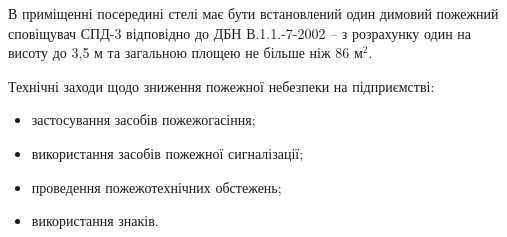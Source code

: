 В приміщенні посередині стелі має бути встановлений один димовий пожежний сповіщувач СПД-3 відповідно до ДБН В.1.1.-7-2002 – з розрахунку один на висоту до 3,5 м та загальною площею не більше ніж 86 м$^2$.

Технічні заходи щодо зниження пожежної небезпеки на підприємстві:
\begin{itemize}
	\item застосування засобів пожежогасіння;
	\item використання засобів пожежної сигналізації;
	\item проведення пожежотехнічних обстежень;
	\item використання знаків.
\end{itemize}